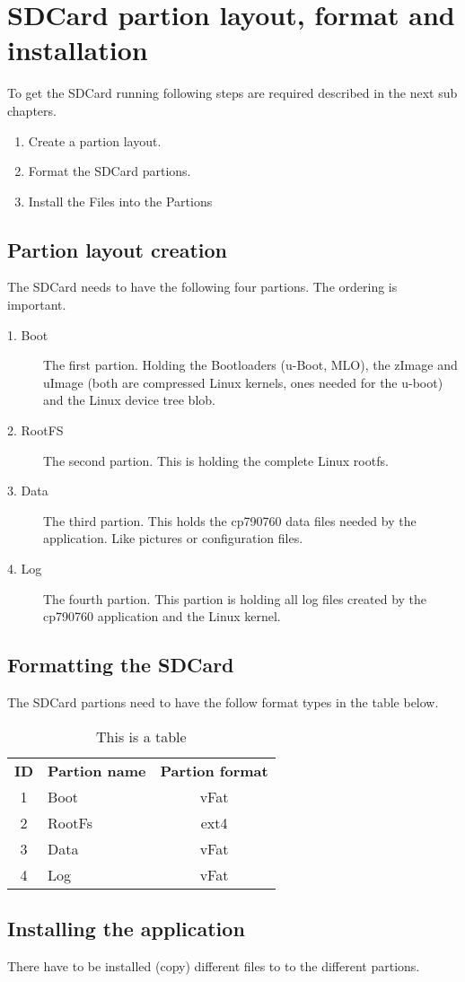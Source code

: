 \chapter{SDCard partion layout, format and installation}%
\label{cha:sdcard}

To get the SDCard running following steps are required described in the
next sub chapters.

\begin{enumerate}
    \item Create a partion layout.
    \item Format the SDCard partions.
    \item Install the Files into the Partions
\end{enumerate}


\section{Partion layout creation}%
\label{sub:sdcard_layout}
The SDCard needs to have the following four partions. The ordering is important.

\begin{description}
    \item[1. Boot] The first partion. Holding the Bootloaders (u-Boot, MLO),
        the zImage and uImage (both are compressed Linux kernels, ones needed
        for the u-boot) and the Linux device tree blob.
    \item[2. RootFS] The second partion. This is holding the complete Linux
        \gls{rootfs}.
    \item[3. Data] The third partion. This holds the cp790760 data files needed
        by the application. Like pictures or configuration files.
    \item[4. Log] The fourth partion. This partion is holding all log files
        created by the cp790760 application and the Linux kernel.
\end{description}


\section{Formatting the SDCard}%
\label{sub:sdcard_format}
The SDCard partions need to have the follow format types in the table below.

\begin{table}
\centering
{
    \begin{tabular}{ | c | l | c | }
        \hline
        \rowcolor{lightgray} \multicolumn{3}{|c|}{Partion formats} \\
        \hline
        \textbf{ID} & {\bfseries Partion name} & {\bfseries Partion format} \\
        \hline
         1 & Boot & vFat \\
         2 & RootFs & ext4 \\
         3 & Data & vFat \\
         4 & Log & vFat \\
        \hline
    \end{tabular}
}
\caption{This is a table}
\label{tab:partion_formats}
\end{table}

\section{Installing the application}%
\label{sec:sdcard_appinstall}
There have to be installed (copy) different files to to the different partions.

